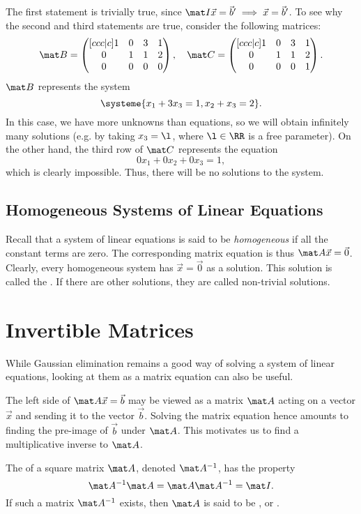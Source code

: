 The first statement is trivially true, since $\mat I \vec x = \vec b' \implies \vec x = \vec b'$. To see why the second and third statements are true, consider the following matrices: \[\mat B = \begin{pmatrix}[ccc|c] 1 & 0 & 3 & 1 \\ 0 & 1 & 1 & 2 \\ 0 & 0 & 0 & 0\end{pmatrix}, \quad \mat C = \begin{pmatrix}[ccc|c] 1 & 0 & 3 & 1 \\ 0 & 1 & 1 & 2 \\ 0 & 0 & 0 & 1\end{pmatrix}.\] $\mat B$ represents the system \[\systeme{x_1 + 3x_3 = 1, x_2 + x_3 = 2}.\] In this case, we have more unknowns than equations, so we will obtain infinitely many solutions (e.g. by taking $x_3 = \l$, where $\l \in \RR$ is a free parameter). On the other hand, the third row of $\mat C$ represents the equation \[0x_1 + 0x_2 + 0x_3 = 1,\] which is clearly impossible. Thus, there will be no solutions to the system.

\subsection{Homogeneous Systems of Linear Equations}

Recall that a system of linear equations is said to be \emph{homogeneous} if all the constant terms are zero. The corresponding matrix equation is thus $\mat A \vec x = \vec 0$. Clearly, every homogeneous system has $\vec x = \vec 0$ as a solution. This solution is called the . If there are other solutions, they are called non-trivial solutions.

\section{Invertible Matrices}

While Gaussian elimination remains a good way of solving a system of linear equations, looking at them as a matrix equation can also be useful.

The left side of $\mat A \vec x = \vec b$ may be viewed as a matrix $\mat A$ acting on a vector $\vec x$ and sending it to the vector $\vec b$. Solving the matrix equation hence amounts to finding the pre-image of $\vec b$ under $\mat A$. This motivates us to find a multiplicative inverse to $\mat A$.

\begin{definition}
    The  of a square matrix $\mat A$, denoted $\mat A^{-1}$, has the property \[\mat A^{-1} \mat A = \mat A \mat A^{-1} = \mat I.\] If such a matrix $\mat A^{-1}$ exists, then $\mat A$ is said to be , or .
\end{definition}

